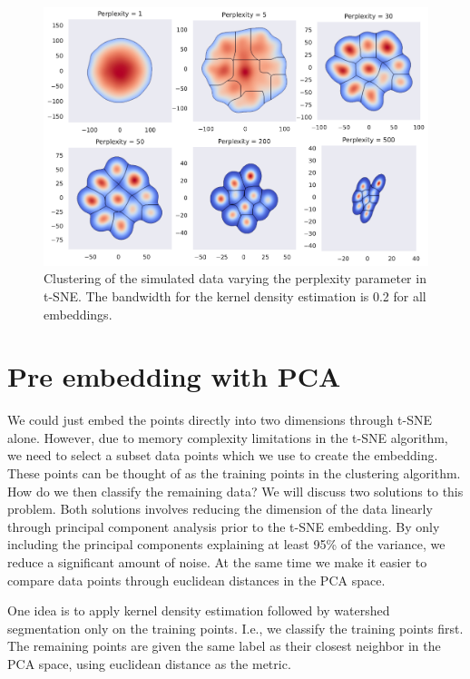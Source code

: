 \documentclass[a4paper, 10pt]{memoir}
\theoremstyle{plain}
\theoremstyle{definition}
\theoremstyle{remark}
\begin{document}
\begin{figure}[tb]
        \centering
        \includegraphics[width=1\linewidth]{./code/figures/perplexity_tuning_simulated.pdf}
        \caption{Clustering of the simulated data varying the perplexity parameter in t-SNE.
        The bandwidth for the kernel density estimation is 0.2 for all embeddings.}
        \label{fig:perplexity_tuning_simulated}
\end{figure}


\section{Pre embedding with PCA}
We could just embed the points directly into two dimensions through t-SNE alone.
However, due to memory complexity limitations in the t-SNE algorithm, we need to select a subset data points which we use to create the embedding.
These points can be thought of as the training points in the clustering algorithm.
How do we then classify the remaining data?
We will discuss two solutions to this problem.
Both solutions involves reducing the dimension of the data linearly through principal component analysis prior to the t-SNE embedding.
By only including the principal components explaining at least 95\% of the variance, we reduce a significant amount of noise.
At the same time we make it easier to compare data points through euclidean distances in the PCA space.

One idea is to apply kernel density estimation followed by watershed segmentation only on the training points.
I.e., we classify the training points first.
The remaining points are given the same label as their closest neighbor in the PCA space, using euclidean distance as the metric.
\end{document}
